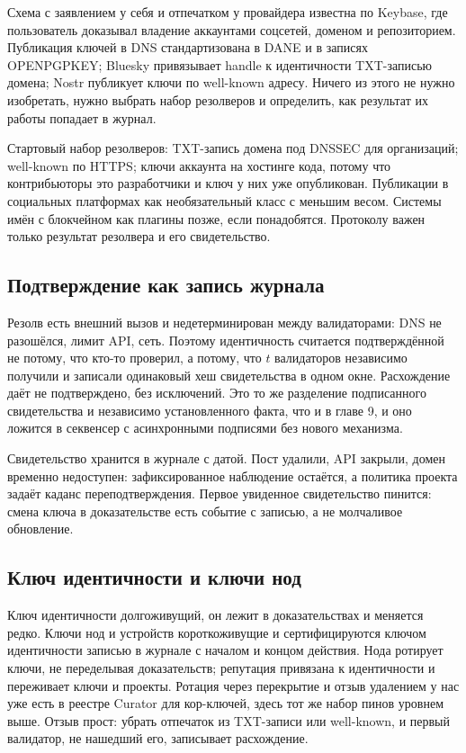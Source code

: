 \begin{likbez}
Схема с заявлением у себя и отпечатком у провайдера известна по Keybase, где пользователь доказывал владение аккаунтами соцсетей, доменом и репозиторием. Публикация ключей в DNS стандартизована в DANE и в записях OPENPGPKEY; Bluesky привязывает handle к идентичности TXT-записью домена; Nostr публикует ключи по well-known адресу. Ничего из этого не нужно изобретать, нужно выбрать набор резолверов и определить, как результат их работы попадает в журнал.
\end{likbez}

Стартовый набор резолверов: TXT-запись домена под DNSSEC для организаций; well-known по HTTPS; ключи аккаунта на хостинге кода, потому что контрибьюторы это разработчики и ключ у них уже опубликован. Публикации в социальных платформах как необязательный класс с меньшим весом. Системы имён с блокчейном как плагины позже, если понадобятся. Протоколу важен только результат резолвера и его свидетельство.

\subsection{Подтверждение как запись журнала}

Резолв есть внешний вызов и недетерминирован между валидаторами: DNS не разошёлся, лимит API, сеть. Поэтому идентичность считается подтверждённой не потому, что кто-то проверил, а потому, что $t$ валидаторов независимо получили и записали одинаковый хеш свидетельства в одном окне. Расхождение даёт не подтверждено, без исключений. Это то же разделение подписанного свидетельства и независимо установленного факта, что и в главе 9, и оно ложится в секвенсер с асинхронными подписями без нового механизма.

Свидетельство хранится в журнале с датой. Пост удалили, API закрыли, домен временно недоступен: зафиксированное наблюдение остаётся, а политика проекта задаёт каданс переподтверждения. Первое увиденное свидетельство пинится: смена ключа в доказательстве есть событие с записью, а не молчаливое обновление.

\subsection{Ключ идентичности и ключи нод}

Ключ идентичности долгоживущий, он лежит в доказательствах и меняется редко. Ключи нод и устройств короткоживущие и сертифицируются ключом идентичности записью в журнале с началом и концом действия. Нода ротирует ключи, не переделывая доказательств; репутация привязана к идентичности и переживает ключи и проекты. Ротация через перекрытие и отзыв удалением у нас уже есть в реестре Curator для кор-ключей, здесь тот же набор пинов уровнем выше. Отзыв прост: убрать отпечаток из TXT-записи или well-known, и первый валидатор, не нашедший его, записывает расхождение.

